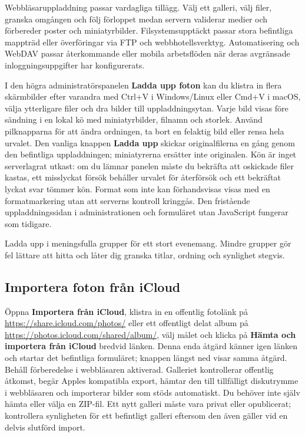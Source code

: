 \documentclass[11pt,a4paper]{article}
\newcommand{\ui}[1]{\textbf{#1}}
\begin{document}
Webbläsaruppladdning passar vardagliga tillägg. Välj ett galleri, välj filer,
granska omgången och följ förloppet medan servern validerar medier och
förbereder poster och miniatyrbilder. Filsystemsupptäckt passar stora befintliga
mappträd eller överföringar via FTP och webbhotellsverktyg. Automatisering och
WebDAV passar återkommande eller mobila arbetsflöden när deras avgränsade
inloggningsuppgifter har konfigurerats.

I den högra administratörspanelen \ui{Ladda upp foton} kan du klistra in flera
skärmbilder efter varandra med Ctrl+V i Windows/Linux eller Cmd+V i macOS, välja
ytterligare filer och dra bilder till uppladdningsytan. Varje bild visas före
sändning i en lokal kö med miniatyrbilder, filnamn och storlek. Använd
pilknapparna för att ändra ordningen, ta bort en felaktig bild eller rensa hela
urvalet. Den vanliga knappen \ui{Ladda upp} skickar originalfilerna en gång
genom den befintliga uppladdningen; miniatyrerna ersätter inte originalen. Kön
är inget serverlagrat utkast: om du lämnar panelen måste du bekräfta att
oskickade filer kastas, ett misslyckat försök behåller urvalet för återförsök
och ett bekräftat lyckat svar tömmer kön. Format som inte kan förhandsvisas
visas med en formatmarkering utan att serverns kontroll kringgås. Den fristående
uppladdningssidan i administrationen och formuläret utan JavaScript fungerar som
tidigare.

Ladda upp i meningsfulla grupper för ett stort evenemang. Mindre grupper gör fel
lättare att hitta och låter dig granska titlar, ordning och synlighet stegvis.


\subsection{Importera foton från iCloud}
Öppna \ui{Importera från iCloud}, klistra in en offentlig fotolänk på
\url{https://share.icloud.com/photos/} eller ett offentligt delat album på
\url{https://photos.icloud.com/shared/album/}, välj målet och klicka på
\ui{Hämta och importera från iCloud} bredvid länken. Denna enda åtgärd känner
igen länken och startar det befintliga formuläret; knappen längst ned visar
samma åtgärd. Behåll förberedelse i webbläsaren aktiverad. Galleriet
kontrollerar offentlig åtkomst, begär Apples kompatibla export, hämtar den till
tillfälligt diskutrymme i webbläsaren och importerar bilder som stöds
automatiskt. Du behöver inte själv hämta eller välja en ZIP-fil. Ett nytt
galleri måste vara privat eller opublicerat; kontrollera synligheten för ett
befintligt galleri eftersom den även gäller vid en delvis slutförd import.
\end{document}
